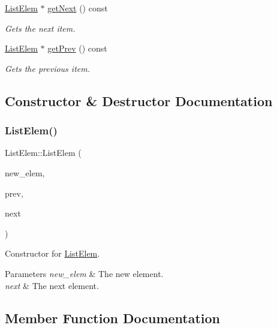 \begin{DoxyCompactItemize}
\hyperlink{class_list_elem}{List\+Elem} $\ast$ \hyperlink{class_list_elem_ac615618c96d2bacc597ba59a4e8e2620}{get\+Next} () const
\begin{DoxyCompactList}\small\item\em Gets the next item. \end{DoxyCompactList}\item 
\hyperlink{class_list_elem}{List\+Elem} $\ast$ \hyperlink{class_list_elem_a5e0941e76c8f85252a84d3ba3b874bc3}{get\+Prev} () const
\begin{DoxyCompactList}\small\item\em Gets the previous item. \end{DoxyCompactList}\end{DoxyCompactItemize}


\subsection{Constructor \& Destructor Documentation}
\mbox{\label{class_list_elem_af7611fadd253200b0eb35a74c2f2f412}} 
\subsubsection{\texorpdfstring{List\+Elem()}{ListElem()}}
{\footnotesize\ttfamily List\+Elem\+::\+List\+Elem (\begin{DoxyParamCaption}\item[{const \hyperlink{class_student}{Student} \&}]{new\+\_\+elem,  }\item[{\hyperlink{class_list_elem}{List\+Elem} $\ast$const}]{prev,  }\item[{\hyperlink{class_list_elem}{List\+Elem} $\ast$const}]{next }\end{DoxyParamCaption})}



Constructor for \hyperlink{class_list_elem}{List\+Elem}. 


\begin{DoxyParams}{Parameters}
{\em new\+\_\+elem} & The new element. \\
\hline
{\em next} & The next element. \\
\hline
\end{DoxyParams}


\subsection{Member Function Documentation}
\mbox{\label{class_list_elem_af80ce8c80d9e4dfa450d9272c965e110}} 
